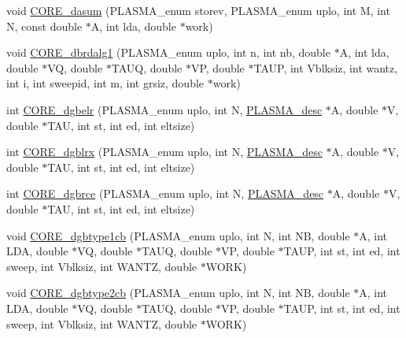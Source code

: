 \begin{DoxyCompactItemize}
\item 
void \hyperlink{group__CORE__double_ga11c4e4a071c38e9623b0a1279cb73499_ga11c4e4a071c38e9623b0a1279cb73499}{C\+O\+R\+E\+\_\+dasum} (P\+L\+A\+S\+M\+A\+\_\+enum storev, P\+L\+A\+S\+M\+A\+\_\+enum uplo, int M, int N, const double $\ast$A, int lda, double $\ast$work)
\item 
void \hyperlink{group__CORE__double_ga7e2b483dffea59c30d89f188b2c7be40_ga7e2b483dffea59c30d89f188b2c7be40}{C\+O\+R\+E\+\_\+dbrdalg1} (P\+L\+A\+S\+M\+A\+\_\+enum uplo, int n, int nb, double $\ast$A, int lda, double $\ast$V\+Q, double $\ast$T\+A\+U\+Q, double $\ast$V\+P, double $\ast$T\+A\+U\+P, int Vblksiz, int wantz, int i, int sweepid, int m, int grsiz, double $\ast$work)
\item 
int \hyperlink{group__CORE__double_gaad4a5ec87fa6d69ba1a6fb03f7b3963d_gaad4a5ec87fa6d69ba1a6fb03f7b3963d}{C\+O\+R\+E\+\_\+dgbelr} (P\+L\+A\+S\+M\+A\+\_\+enum uplo, int N, \hyperlink{structplasma__desc__t}{P\+L\+A\+S\+M\+A\+\_\+desc} $\ast$A, double $\ast$V, double $\ast$T\+A\+U, int st, int ed, int eltsize)
\item 
int \hyperlink{group__CORE__double_ga33d2edbfc8d4322981b57243433758e8_ga33d2edbfc8d4322981b57243433758e8}{C\+O\+R\+E\+\_\+dgblrx} (P\+L\+A\+S\+M\+A\+\_\+enum uplo, int N, \hyperlink{structplasma__desc__t}{P\+L\+A\+S\+M\+A\+\_\+desc} $\ast$A, double $\ast$V, double $\ast$T\+A\+U, int st, int ed, int eltsize)
\item 
int \hyperlink{group__CORE__double_gaf8beaaa27cb9a11f78eac099fbacd4b8_gaf8beaaa27cb9a11f78eac099fbacd4b8}{C\+O\+R\+E\+\_\+dgbrce} (P\+L\+A\+S\+M\+A\+\_\+enum uplo, int N, \hyperlink{structplasma__desc__t}{P\+L\+A\+S\+M\+A\+\_\+desc} $\ast$A, double $\ast$V, double $\ast$T\+A\+U, int st, int ed, int eltsize)
\item 
void \hyperlink{group__CORE__double_gaf7c14d4df0b70516d0b7dba06a76eaa5_gaf7c14d4df0b70516d0b7dba06a76eaa5}{C\+O\+R\+E\+\_\+dgbtype1cb} (P\+L\+A\+S\+M\+A\+\_\+enum uplo, int N, int N\+B, double $\ast$A, int L\+D\+A, double $\ast$V\+Q, double $\ast$T\+A\+U\+Q, double $\ast$V\+P, double $\ast$T\+A\+U\+P, int st, int ed, int sweep, int Vblksiz, int W\+A\+N\+T\+Z, double $\ast$W\+O\+R\+K)
\item 
void \hyperlink{group__CORE__double_ga110e47047bf9b4e72abf8e9b5ceeb05f_ga110e47047bf9b4e72abf8e9b5ceeb05f}{C\+O\+R\+E\+\_\+dgbtype2cb} (P\+L\+A\+S\+M\+A\+\_\+enum uplo, int N, int N\+B, double $\ast$A, int L\+D\+A, double $\ast$V\+Q, double $\ast$T\+A\+U\+Q, double $\ast$V\+P, double $\ast$T\+A\+U\+P, int st, int ed, int sweep, int Vblksiz, int W\+A\+N\+T\+Z, double $\ast$W\+O\+R\+K)

\end{DoxyCompactItemize}
